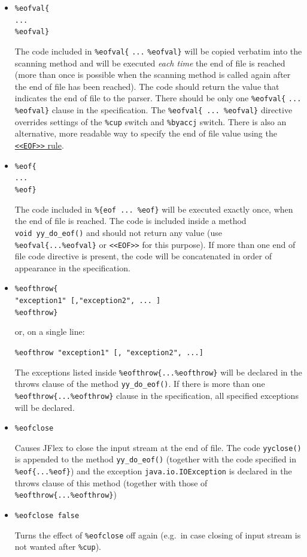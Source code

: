 \begin{itemize}
\item
  \texttt{\%eofval\{}\\\texttt{...}\\\texttt{\%eofval\}}

  The code included in \texttt{\%eofval\{} \texttt{...}
  \texttt{\%eofval\}} will be copied verbatim into the scanning method
  and will be executed \emph{each time} the end of file is reached (more
  than once is possible when the scanning method is called again after
  the end of file has been reached). The code should return the value
  that indicates the end of file to the parser. There should be only one
  \texttt{\%eofval\{} \texttt{...} \texttt{\%eofval\}} clause in the
  specification. The \texttt{\%eofval\{\ ...\ \%eofval\}} directive
  overrides settings of the \texttt{\%cup} switch and \texttt{\%byaccj}
  switch. There is also an alternative, more readable way to specify the
  end of file value using the
  \hyperref[Grammar]{\texttt{\textless{}\textless{}EOF\textgreater{}\textgreater{}}
  rule}.
\item
  \texttt{\%eof\{}\\\texttt{...}\\\texttt{\%eof\}}

  The code included in \texttt{\%\{eof\ ...\ \%eof\}} will be executed
  exactly once, when the end of file is reached. The code is included
  inside a method \texttt{void\ yy\_do\_eof()} and should not return any
  value (use \texttt{\%eofval\{...\%eofval\}} or
  \texttt{\textless{}\textless{}EOF\textgreater{}\textgreater{}} for
  this purpose). If more than one end of file code directive is present,
  the code will be concatenated in order of appearance in the
  specification.
\item
  \texttt{\%eofthrow\{}\\\texttt{"exception1"\ {[},"exception2",\ ...\ {]}}\\\texttt{\%eofthrow\}}

  or, on a single line:

  \texttt{\%eofthrow\ "exception1"\ {[},\ "exception2",\ ...{]}}

  The exceptions listed inside \texttt{\%eofthrow\{...\%eofthrow\}} will
  be declared in the throws clause of the method \texttt{yy\_do\_eof()}.
  If there is more than one \texttt{\%eofthrow\{...\%eofthrow\}} clause
  in the specification, all specified exceptions will be declared.
\item
  \texttt{\%eofclose}

  Causes JFlex to close the input stream at the end of file. The code
  \texttt{yyclose()} is appended to the method \texttt{yy\_do\_eof()}
  (together with the code specified in \texttt{\%eof\{...\%eof\}}) and
  the exception \texttt{java.io.IOException} is declared in the throws
  clause of this method (together with those of
  \texttt{\%eofthrow\{...\%eofthrow\}})
\item
  \texttt{\%eofclose\ false}

  Turns the effect of \texttt{\%eofclose} off again (e.g.~in case
  closing of input stream is not wanted after \texttt{\%cup}).
\end{itemize}

